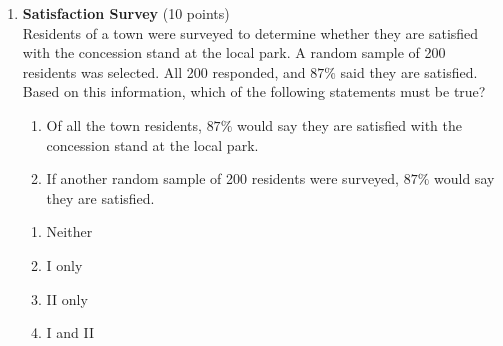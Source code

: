 \begin{enumerate}
  \item \textbf{Satisfaction Survey} (10 points)\\
  Residents of a town were surveyed to determine whether they are satisfied with the concession stand at the local park. A random sample of 200 residents was selected. All 200 responded, and $87\%$ said they are satisfied. Based on this information, which of the following statements must be true?
  \begin{enumerate}[label=(\Roman*)]
    \item Of all the town residents, $87\%$ would say they are satisfied with the concession stand at the local park.
    \item If another random sample of 200 residents were surveyed, $87\%$ would say they are satisfied.
  \end{enumerate}
  \begin{enumerate}[label=(\Alph*)]
    \item Neither
    \item I only
    \item II only
    \item I and II
  \end{enumerate}
  \begin{subanswer}
  \end{subanswer}
\end{enumerate}




